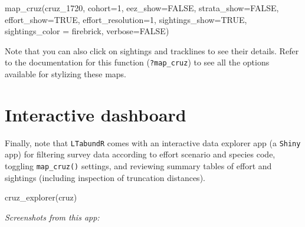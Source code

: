 \documentclass[
]{book}
\newenvironment{Shaded}{\begin{snugshade}}{\end{snugshade}}
\newcommand{\AttributeTok}[1]{\textcolor[rgb]{0.77,0.63,0.00}{#1}}
\newcommand{\ConstantTok}[1]{\textcolor[rgb]{0.00,0.00,0.00}{#1}}
\newcommand{\DecValTok}[1]{\textcolor[rgb]{0.00,0.00,0.81}{#1}}
\newcommand{\FunctionTok}[1]{\textcolor[rgb]{0.00,0.00,0.00}{#1}}
\newcommand{\NormalTok}[1]{#1}
\newcommand{\StringTok}[1]{\textcolor[rgb]{0.31,0.60,0.02}{#1}}
\begin{document}
\begin{Shaded}
\begin{Highlighting}[]
 \FunctionTok{map\_cruz}\NormalTok{(cruz\_1720,}
          \AttributeTok{cohort=}\DecValTok{1}\NormalTok{,}
          \AttributeTok{eez\_show=}\ConstantTok{FALSE}\NormalTok{,}
          \AttributeTok{strata\_show=}\ConstantTok{FALSE}\NormalTok{,}
          \AttributeTok{effort\_show=}\ConstantTok{TRUE}\NormalTok{,}
          \AttributeTok{effort\_resolution=}\DecValTok{1}\NormalTok{,}
          \AttributeTok{sightings\_show=}\ConstantTok{TRUE}\NormalTok{,}
          \AttributeTok{sightings\_color =} \StringTok{\textquotesingle{}firebrick\textquotesingle{}}\NormalTok{,}
          \AttributeTok{verbose=}\ConstantTok{FALSE}\NormalTok{)}
\end{Highlighting}
\end{Shaded}

Note that you can also click on sightings and tracklines to see their details. Refer to the documentation for this function (\texttt{?map\_cruz}) to see all the options available for stylizing these maps.

\hypertarget{interactive-dashboard}{%
\section*{Interactive dashboard}\label{interactive-dashboard}}

Finally, note that \texttt{LTabundR} comes with an interactive data explorer app (a \texttt{Shiny} app) for filtering survey data according to effort scenario and species code, toggling \texttt{map\_cruz()} settings, and reviewing summary tables of effort and sightings (including inspection of truncation distances).

\begin{Shaded}
\begin{Highlighting}[]
\FunctionTok{cruz\_explorer}\NormalTok{(cruz)}
\end{Highlighting}
\end{Shaded}

\emph{Screenshots from this app:}

~\\
\end{document}

